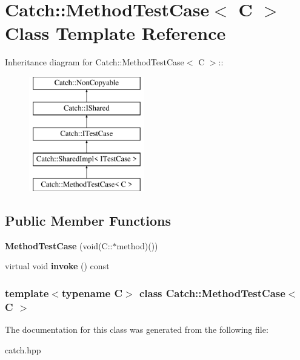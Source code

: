 \hypertarget{classCatch_1_1MethodTestCase}{
\section{Catch::MethodTestCase$<$ C $>$ Class Template Reference}
\label{classCatch_1_1MethodTestCase}
}
Inheritance diagram for Catch::MethodTestCase$<$ C $>$::\begin{figure}[H]
\begin{center}
\leavevmode
\includegraphics[height=5cm]{classCatch_1_1MethodTestCase}
\end{center}
\end{figure}
\subsection*{Public Member Functions}
\begin{DoxyCompactItemize}
\item 
\hypertarget{classCatch_1_1MethodTestCase_a7b043b85dae371358255dd9dc6582e7b}{
{\bfseries MethodTestCase} (void(C::$\ast$method)())}
\label{classCatch_1_1MethodTestCase_a7b043b85dae371358255dd9dc6582e7b}

\item 
\hypertarget{classCatch_1_1MethodTestCase_a39cc4b760dd71adc3f7550bc1e7eb697}{
virtual void {\bfseries invoke} () const }
\label{classCatch_1_1MethodTestCase_a39cc4b760dd71adc3f7550bc1e7eb697}

\end{DoxyCompactItemize}
\subsubsection*{template$<$typename C$>$ class Catch::MethodTestCase$<$ C $>$}



The documentation for this class was generated from the following file:\begin{DoxyCompactItemize}
\item 
catch.hpp\end{DoxyCompactItemize}
